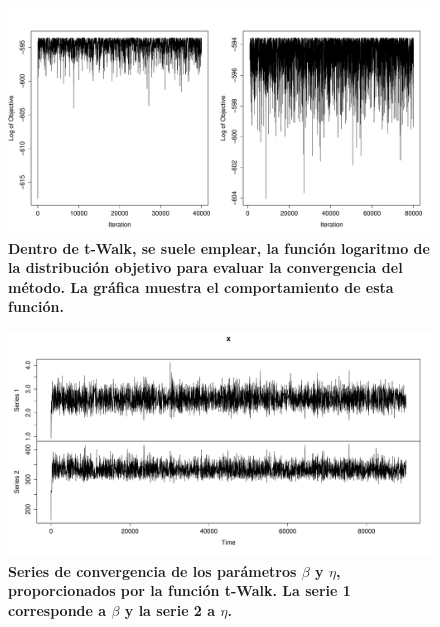 \begin{figure}
\begin{center}
\includegraphics[scale=0.3]{logObj1.pdf} %
\end{center}
\vspace{-1cm} \caption{{\bf Dentro de t-Walk, se suele emplear, la funci\'on logaritmo de la distribuci\'on objetivo para evaluar la convergencia del m\'etodo. La gr\'afica muestra el comportamiento de esta funci\'on.}\label{mlog}}
\end{figure}

\begin{figure}
\begin{center}
\includegraphics[scale=0.25]{serie.pdf}
\end{center}
\vspace{-1cm}\caption{{\bf Series de convergencia de los par\'ametros $\beta$ y $\eta$, proporcionados por la funci\'on t-Walk. La serie 1 corresponde a $\beta$ y la serie 2 a $\eta$.}\label{serie}}
\end{figure}


